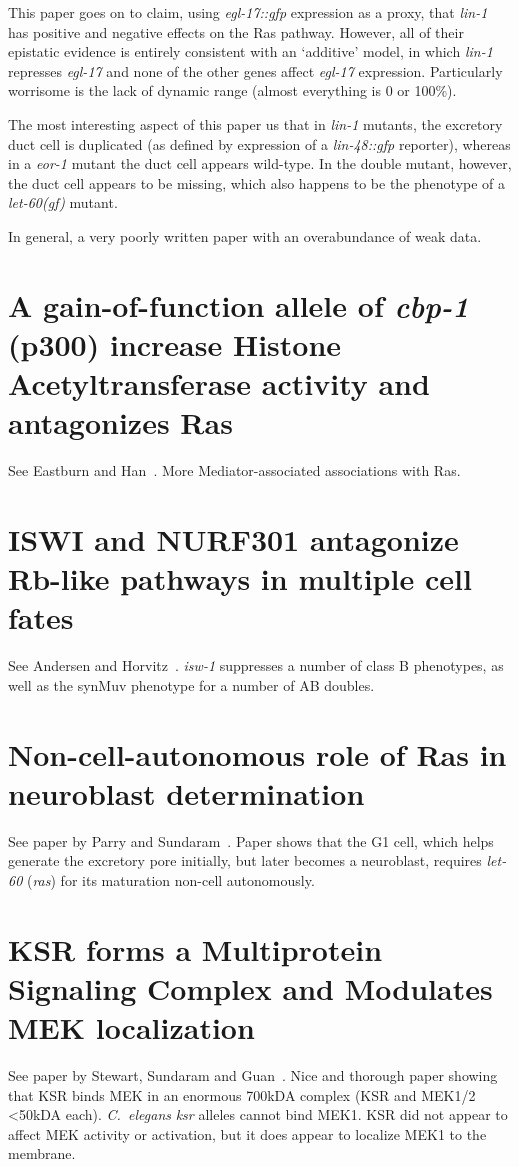 \documentclass[10pt, onecolumn]{article}
\newcommand{\cel}{\emph{C.~elegans}}
\newcommand{\gene}[1]{\mbox{\emph{#1}}}
\newcommand{\ras}{\gene{let-60} (\emph{ras})}
\newcommand{\letgf}{\gene{let-60(gf)}}
\begin{document}
This paper goes on to claim, using \gene{egl-17::gfp} expression as a proxy,
that \gene{lin-1} has positive and negative effects on the Ras pathway. However,
all of their epistatic evidence is entirely consistent with an `additive' model,
in which \gene{lin-1} represses \gene{egl-17} and none of the other genes affect
\gene{egl-17} expression. Particularly worrisome is the lack of dynamic range
(almost everything is 0 or 100\%).

The most interesting aspect of this paper us that in \gene{lin-1} mutants, the
excretory duct cell is duplicated (as defined by expression of a
\gene{lin-48::gfp} reporter), whereas in a \gene{eor-1} mutant the duct cell
appears wild-type. In the double mutant, however, the duct cell appears to be
missing, which also happens to be the phenotype of a \letgf{} mutant.

In general, a very poorly written paper with an overabundance of weak data.

\section*{A gain-of-function allele of \gene{cbp-1} (p300) increase Histone
          Acetyltransferase activity and antagonizes Ras}
See Eastburn and Han~\cite{Eastburn2005}. More Mediator-associated associations with Ras.

\section*{ISWI and NURF301 antagonize Rb-like pathways in multiple cell fates}
See Andersen and Horvitz~\cite{}. \gene{isw-1} suppresses a number of class B
phenotypes, as well as the synMuv phenotype for a number of AB doubles.

\section*{Non-cell-autonomous role of Ras in neuroblast determination}
See paper by Parry and Sundaram~\cite{Parry2014}. Paper shows that the G1 cell, which
helps generate the excretory pore initially, but later becomes a neuroblast,
requires \ras{} for its maturation non-cell autonomously.

\section*{KSR forms a Multiprotein Signaling Complex and Modulates MEK
          localization}
See paper by Stewart, Sundaram and Guan~\cite{Stewart1999}. Nice and thorough paper showing
that KSR binds MEK in an enormous 700kDA complex (KSR and MEK1/2 <50kDA each).
\cel{} \gene{ksr} alleles cannot bind MEK1. KSR did not appear to affect MEK
activity or activation, but it does appear to localize MEK1 to the membrane.
\end{document}
